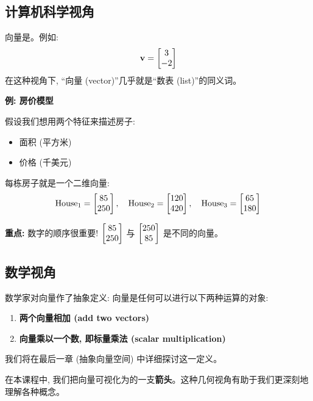 \subsection{计算机科学视角}

\begin{definition}[计算机科学视角下的向量]
向量是。例如:
\[
\mathbf{v} = \begin{bmatrix} 3 \\ -2 \end{bmatrix}
\]
在这种视角下, ``向量 (vector)''几乎就是``数表 (list)''的同义词。
\end{definition}

\begin{practical}
\textbf{例: 房价模型}

假设我们想用两个特征来描述房子:
\begin{itemize}
    \item 面积 (平方米)
    \item 价格 (千美元)
\end{itemize}

每栋房子就是一个二维向量:
\[
\text{House}_1 = \begin{bmatrix} 85 \\ 250 \end{bmatrix}, \quad
\text{House}_2 = \begin{bmatrix} 120 \\ 420 \end{bmatrix}, \quad
\text{House}_3 = \begin{bmatrix} 65 \\ 180 \end{bmatrix}
\]

\textbf{重点:} 数字的顺序很重要! $\begin{bmatrix} 85 \\ 250 \end{bmatrix}$ 与 $\begin{bmatrix} 250 \\ 85 \end{bmatrix}$ 是不同的向量。
\end{practical}

\subsection{数学视角}

\begin{definition}[数学视角下的向量]
数学家对向量作了抽象定义: 向量是任何可以进行以下两种运算的对象:
\begin{enumerate}
    \item \textbf{两个向量相加 (add two vectors)}
    \item \textbf{向量乘以一个数, 即标量乘法 (scalar multiplication)}
\end{enumerate}
我们将在最后一章 (抽象向量空间) 中详细探讨这一定义。
\end{definition}

\begin{important}
在本课程中, 我们把向量可视化为的一支\textbf{箭头}。这种几何视角有助于我们更深刻地理解各种概念。
\end{important}

